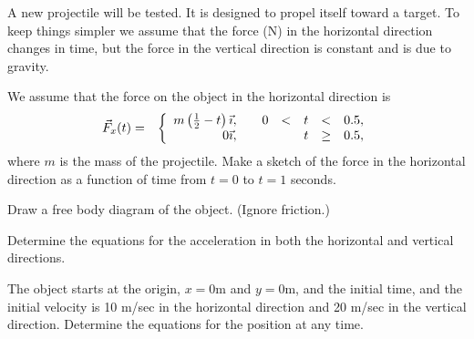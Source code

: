 \begin{problem}
\item A new projectile will be tested. It is designed to propel itself
  toward a target. To keep things simpler we assume that the force (N)
  in the horizontal direction changes in time, but the force in the
  vertical direction is constant and is due to gravity.
  \begin{subproblem}
    \item We assume that the force on the object in the horizontal
      direction is 
      \begin{eqnarray*}
        \vec{F}_x(t) & = & \left\{
                     \begin{array}{r@{\hspace{2em}}rcccl}
                       m\left(\frac{1}{2}-t\right) \vec{\imath}, & 0 & < & t & < & 0.5, \\
                       0 \vec{\imath},        &   &   & t & \geq & 0.5,
                     \end{array}
                     \right.
      \end{eqnarray*}
      where $m$ is the mass of the projectile.  Make a sketch of the
      force in the horizontal direction as a function of time from
      $t=0$ to $t=1$ seconds.  

      \vfill

    \item Draw a free body diagram of the object. (Ignore friction.)
      \vfill

    \item Determine the equations for the acceleration in both the
      horizontal and vertical directions.

      \vfill

      \clearpage

    \item The object starts at the origin, $x=0$m and $y=0$m, and the
      initial time, and the initial velocity is 10 m/sec in the
      horizontal direction and 20 m/sec in the vertical
      direction. Determine the equations for the position at any time.

      \vfill

  \end{subproblem}

  \clearpage


\end{problem}
